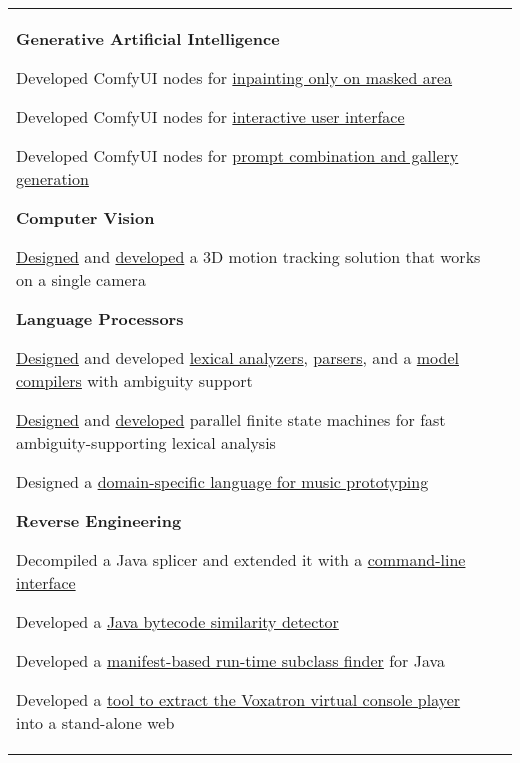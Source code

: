 \documentclass[letterpaper,10pt,oneside]{article}
\newcommand{\itemspacingtwo}{\vspace{0.08cm}}
\newenvironment{body}
{\par\par
\begin{longtable}{p{0.145\textwidth}p{0.81\textwidth}}}
{\par\end{longtable}\par}
\begin{document}
\begin{body}
\textbf{Generative Artificial Intelligence}
\begin{comp}
\item Developed ComfyUI nodes for \href{https://github.com/lquesada/ComfyUI-Inpaint-CropAndStitch}{inpainting only on masked area}
\item Developed ComfyUI nodes for \href{https://github.com/lquesada/ComfyUI-Interactive}{interactive user interface}
\item Developed ComfyUI nodes for \href{https://github.com/lquesada/ComfyUI-Prompt-Combinator}{prompt combination and gallery generation}
\end{comp}
\itemspacingtwo

\textbf{Computer Vision}
\begin{comp}
\item \href{https://www.worldscientific.com/doi/abs/10.1142/S0129065712500190}{Designed} and \href{https://github.com/lquesada/MotionTracking}{developed} a 3D motion tracking solution that works on a single camera
\end{comp}
\itemspacingtwo

\textbf{Language Processors}
\begin{comp}
\item \href{https://www.worldscientific.com/doi/abs/10.1142/S0218194014500375}{Designed} and developed \href{https://github.com/lquesada/ModelCC/tree/master/ModelCC/src/org/modelcc/lexer}{lexical analyzers}, \href{https://github.com/lquesada/ModelCC/tree/master/ModelCC/src/org/modelcc/parser}{parsers}, and a \href{https://github.com/lquesada/ModelCC}{model compilers} with ambiguity support
\item \href{https://www.scitepress.org/Link.aspx?doi=10.5220/0003949901050110}{Designed} and \href{https://github.com/lquesada/PFSMs-Java}{developed} parallel finite state machines for fast ambiguity-supporting lexical analysis 
\item Designed a \href{https://github.com/lquesada/ADAgio}{domain-specific language for music prototyping}
\end{comp}
\itemspacingtwo

\textbf{Reverse Engineering}
\begin{comp}
\item Decompiled a Java splicer and extended it with a \href{https://github.com/lquesada/JarSplicePlus}{command-line interface}
\item Developed a \href{https://github.com/lquesada/JSimil}{Java bytecode similarity detector}
\item Developed a \href{https://github.com/lquesada/RunTimeSubclassFinder}{manifest-based run-time subclass finder} for Java
\item Developed a \href{https://github.com/lquesada/voxatron-in-a-web}{tool to extract the Voxatron virtual console player} into a stand-alone web
\end{comp}
\itemspacingtwo


\end{body}
\end{document}
